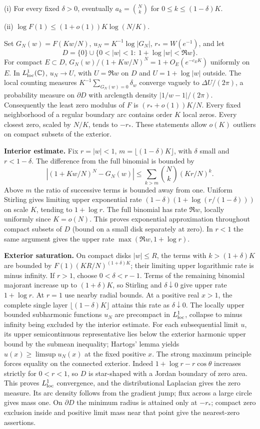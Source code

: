 \documentclass[11pt]{article}
\begin{document}
\par\noindent (i) For every fixed \(\delta>0\), eventually \(a_k={N\choose k}\) for \(0\le k\le(1-\delta)K\).
\par\noindent (ii) \(\log F(1)\le (1+o(1))K\log(N/K)\).

Set \(G_N(w)=F(Kw/N)\), \(u_N=K^{-1}\log|G_N|\), \(r_*=W(e^{-1})\), and let
\[
 D=\{0\}\cup\{0<|w|<1:\ 1+\log|w|<\Re w\}.
\]
For compact \(E\subset D\), \(G_N(w)/(1+Kw/N)^N=1+O_E(e^{-c_E K})\) uniformly on \(E\). In \(L^1_{\rm loc}(\mathbb C)\), \(u_N\to U\), with \(U=\Re w\) on \(D\) and \(U=1+\log|w|\) outside. The local counting measures \(K^{-1}\sum_{G_N(w)=0}\delta_w\) converge vaguely to \(\Delta U/(2\pi)\), a probability measure on \(\partial D\) with arclength density \(|1/w-1|/(2\pi)\). Consequently the least zero modulus of \(F\) is \((r_*+o(1))K/N\). Every fixed neighborhood of a regular boundary arc contains order \(K\) local zeros. Every closest zero, scaled by \(N/K\), tends to \(-r_*\). These statements allow \(o(K)\) outliers on compact subsets of the exterior.

\textbf{Interior estimate.} Fix \(r=|w|<1\), \(m=\lfloor(1-\delta)K\rfloor\), with \(\delta\) small and \(r<1-\delta\). The difference from the full binomial is bounded by
\[
 \left|(1+Kw/N)^N-G_N(w)\right|
 \le \sum_{k>m}{N\choose k}(Kr/N)^k.
\]
Above \(m\) the ratio of successive terms is bounded away from one. Uniform Stirling gives limiting upper exponential rate \( (1-\delta)(1+\log(r/(1-\delta)))\) on scale \(K\), tending to \(1+\log r\). The full binomial has rate \(\Re w\), locally uniformly since \(K=o(N)\). This proves exponential approximation throughout compact subsets of \(D\) (bound on a small disk separately at zero). In \(r<1\) the same argument gives the upper rate \(\max(\Re w,1+\log r)\).

\textbf{Exterior saturation.} On compact disks \(|w|\le R\), the terms with \(k>(1+\delta)K\) are bounded by \(F(1)(KR/N)^{(1+\delta)K}\); their limiting upper logarithmic rate is minus infinity. If \(r>1\), choose \(0<\delta<r-1\). Terms of the remaining binomial majorant increase up to \((1+\delta)K\), so Stirling and \(\delta\downarrow0\) give upper rate \(1+\log r\). At \(r=1\) use nearby radial bounds. At a positive real \(x>1\), the complete single layer \(\lfloor(1-\delta)K\rfloor\) attains this rate as \(\delta\downarrow0\). The locally upper bounded subharmonic functions \(u_N\) are precompact in \(L^1_{\rm loc}\), collapse to minus infinity being excluded by the interior estimate. For each subsequential limit \(u\), its upper semicontinuous representative lies below the exterior harmonic upper bound by the submean inequality; Hartogs' lemma yields \(u(x)\ge\limsup u_N(x)\) at the fixed positive \(x\). The strong maximum principle forces equality on the connected exterior. Indeed \(1+\log r-r\cos\theta\) increases strictly for \(0<r<1\), so \(D\) is star-shaped with a Jordan boundary of zero area. This proves \(L^1_{\rm loc}\) convergence, and the distributional Laplacian gives the zero measure. Its arc density follows from the gradient jump; flux across a large circle gives mass one. On \(\partial D\) the minimum radius is attained only at \(-r_*\); compact zero exclusion inside and positive limit mass near that point give the nearest-zero assertions.
\end{document}
